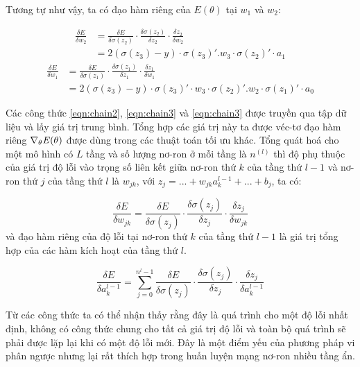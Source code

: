 Tương tự như vậy, ta có đạo hàm riêng của $E(\theta)$ tại $w_1$ và $w_2$:

\begin{equation} \label{eqn:chain3}
\begin{split}
\frac{\delta E}{\delta w_2} &= \frac{\delta E}{\delta \sigma(z_2)}\cdot\frac{\delta \sigma(z_2)}{\delta z_2}\cdot\frac{\delta z_2}{\delta w_2} \\ &= 2(\sigma(z_3)-y)\cdot \sigma(z_3)'.w_3\cdot\sigma(z_2)'\cdot a_1
\end{split}
\end{equation}
\begin{equation} \label{eqn:chain4}
\begin{split} \frac{\delta E}{\delta w_1} &= \frac{\delta E}{\delta \sigma(z_1)}\cdot\frac{\delta \sigma(z_1)}{\delta z_1}\cdot\frac{\delta z_1}{\delta w_1} \\ &= 2(\sigma(z_3)-y)\cdot \sigma(z_3)'\cdot w_3\cdot\sigma(z_2)'.w_2\cdot\sigma(z_1)'\cdot a_0
\end{split}
\end{equation}

Các công thức \ref{eqn:chain2}, \ref{eqn:chain3} và \ref{eqn:chain3} được truyền qua tập dữ liệu và lấy giá trị trung bình. Tổng hợp các giá trị này ta được véc-tơ đạo hàm riêng $\nabla_\theta \mathbf{\it{E}(\theta)}$ được dùng trong các thuật toán tối ưu khác. Tổng quát hoá cho một mô hình có $L$ tầng và số lượng nơ-ron ở mỗi tầng là $n^{(l)}$ thì độ phụ thuộc của giá trị độ lỗi vào trọng số liên kết giữa nơ-ron thứ $k$ của tầng thứ $l-1$ và nơ-ron thứ $j$ của tầng thứ $l$ là $w_{jk}$, với $z_j = ...+w_{jk}a^{l-1}_k+... + b_j$, ta có:

\begin{equation} \label{eqn:chain5}
\frac{\delta E}{\delta w_{jk}} = \frac{\delta E}{\delta \sigma(z_j)} \cdot\frac{\delta \sigma(z_j)}{\delta z_j}\cdot\frac{\delta z_j}{\delta w_{jk}}
\end{equation}
và đạo hàm riêng của độ lỗi tại nơ-ron thứ $k$ của tầng thứ $l - 1$ là giá trị tổng hợp của các hàm kích hoạt của tầng thứ $l$.

\begin{equation} \label{eqn:chain6}
\frac{\delta E}{\delta a_k^{l-1}} = \sum_{j=0}^{n^{l}-1}\frac{\delta E}{\delta \sigma(z_j)}\cdot\frac{\delta \sigma(z_j)}{\delta z_j}\cdot\frac{\delta z_j}{\delta a_k^{l-1}}
\end{equation}

Từ các công thức ta có thể nhận thấy rằng đây là quá trình cho một độ lỗi nhất định, không có công thức chung cho tất cả giá trị độ lỗi và toàn bộ quá trình sẽ phải được lặp lại khi có một độ lỗi mới. Đây là một điểm yếu của phương pháp vi phân ngược nhưng lại rất thích hợp trong huấn luyện mạng nơ-ron nhiều tầng ẩn.